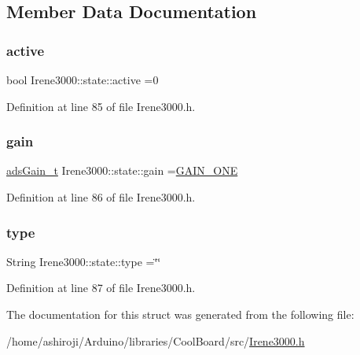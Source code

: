 \subsection{Member Data Documentation}
\mbox{\label{struct_irene3000_1_1state_a879828ace7e7a7bc91ff703bfee36599}} 
\subsubsection{\texorpdfstring{active}{active}}
{\footnotesize\ttfamily bool Irene3000\+::state\+::active =0}



Definition at line 85 of file Irene3000.\+h.

\mbox{\label{struct_irene3000_1_1state_a1ecf69d38cb31ecaf6b3602a3f3e93cb}} 
\subsubsection{\texorpdfstring{gain}{gain}}
{\footnotesize\ttfamily \hyperlink{_cool_adafruit___a_d_s1015_8h_a3d6c0e15829a207b9155890811fa4781}{ads\+Gain\+\_\+t} Irene3000\+::state\+::gain =\hyperlink{_cool_adafruit___a_d_s1015_8h_a3d6c0e15829a207b9155890811fa4781ab6b0b520637e016e297110bebeb23a54}{G\+A\+I\+N\+\_\+\+O\+NE}}



Definition at line 86 of file Irene3000.\+h.

\mbox{\label{struct_irene3000_1_1state_a9897a7e02727db6351d44006eec73799}} 
\subsubsection{\texorpdfstring{type}{type}}
{\footnotesize\ttfamily String Irene3000\+::state\+::type =\char`\"{}\char`\"{}}



Definition at line 87 of file Irene3000.\+h.



The documentation for this struct was generated from the following file\+:\begin{DoxyCompactItemize}
\item 
/home/ashiroji/\+Arduino/libraries/\+Cool\+Board/src/\hyperlink{_irene3000_8h}{Irene3000.\+h}\end{DoxyCompactItemize}
